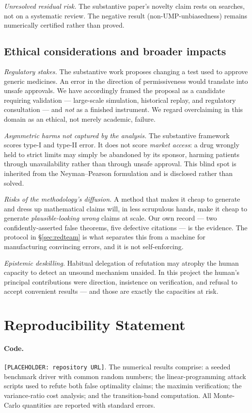 \documentclass[11pt]{article}
\theoremstyle{remark}
\begin{document}
\emph{Unresolved residual risk.} The substantive paper's novelty claim rests on searches, not on a systematic review. The negative result (non-UMP-unbiasedness) remains numerically certified rather than proved.

\subsection{Ethical considerations and broader impacts}
\emph{Regulatory stakes.} The substantive work proposes changing a test used to approve generic medicines. An error in the direction of permissiveness would translate into unsafe approvals. We have accordingly framed the proposal as a candidate requiring validation --- large-scale simulation, historical replay, and regulatory consultation --- and \emph{not} as a finished instrument. We regard overclaiming in this domain as an ethical, not merely academic, failure.

\emph{Asymmetric harms not captured by the analysis.} The substantive framework scores type-I and type-II error. It does not score \emph{market access}: a drug wrongly held to strict limits may simply be abandoned by its sponsor, harming patients through unavailability rather than through unsafe approval. This blind spot is inherited from the Neyman--Pearson formulation and is disclosed rather than solved.

\emph{Risks of the methodology's diffusion.} A method that makes it cheap to generate and dress up mathematical claims will, in less scrupulous hands, make it cheap to generate \emph{plausible-looking wrong} claims at scale. Our own record --- two confidently-asserted false theorems, five defective citations --- is the evidence. The protocol in \S\ref{sec:redteam} is what separates this from a machine for manufacturing convincing errors, and it is not self-enforcing.

\emph{Epistemic deskilling.} Habitual delegation of refutation may atrophy the human capacity to detect an unsound mechanism unaided. In this project the human's principal contributions were direction, insistence on verification, and refusal to accept convenient results --- and those are exactly the capacities at risk.

\section{Reproducibility Statement}
\label{sec:repro}

\paragraph{Code.} \texttt{[PLACEHOLDER: repository URL]}. The numerical results comprise: a seeded benchmark driver with common random numbers; the linear-programming attack scripts used to refute both false optimality claims; the maximin verification; the variance-ratio cost analysis; and the transition-band computation. All Monte-Carlo quantities are reported with standard errors.
\end{document}
